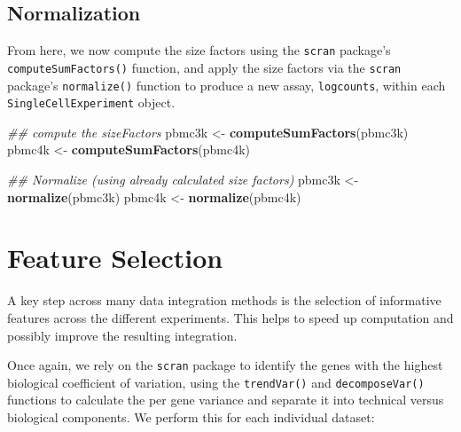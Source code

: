 \documentclass[]{book}
\newenvironment{Shaded}{\begin{snugshade}}{\end{snugshade}}
\newcommand{\CommentTok}[1]{\textcolor[rgb]{0.56,0.35,0.01}{\textit{#1}}}
\newcommand{\KeywordTok}[1]{\textcolor[rgb]{0.13,0.29,0.53}{\textbf{#1}}}
\newcommand{\NormalTok}[1]{#1}
\newcommand{\StringTok}[1]{\textcolor[rgb]{0.31,0.60,0.02}{#1}}
\begin{document}
\hypertarget{normalization-1}{%
\subsection{Normalization}\label{normalization-1}}

From here, we now compute the size factors using the \texttt{scran} package's \texttt{computeSumFactors()} function, and apply the size factors via the \texttt{scran} package's \texttt{normalize()} function to produce a new assay, \texttt{logcounts}, within each \texttt{SingleCellExperiment} object.

\begin{Shaded}
\begin{Highlighting}[]
\CommentTok{## compute the sizeFactors}
\NormalTok{pbmc3k <-}\StringTok{ }\KeywordTok{computeSumFactors}\NormalTok{(pbmc3k)}
\NormalTok{pbmc4k <-}\StringTok{ }\KeywordTok{computeSumFactors}\NormalTok{(pbmc4k)}

\CommentTok{## Normalize (using already calculated size factors)}
\NormalTok{pbmc3k <-}\StringTok{ }\KeywordTok{normalize}\NormalTok{(pbmc3k)}
\NormalTok{pbmc4k <-}\StringTok{ }\KeywordTok{normalize}\NormalTok{(pbmc4k)}
\end{Highlighting}
\end{Shaded}

\hypertarget{feature-selection}{%
\section{Feature Selection}\label{feature-selection}}

A key step across many data integration methods is the selection of informative features across the different experiments. This helps to speed up computation and possibly improve the resulting integration.

Once again, we rely on the \texttt{scran} package to identify the genes with the highest biological coefficient of variation, using the \texttt{trendVar()} and \texttt{decomposeVar()} functions to calculate the per gene variance and separate it into technical versus biological components. We perform this for each individual dataset:
\end{document}
